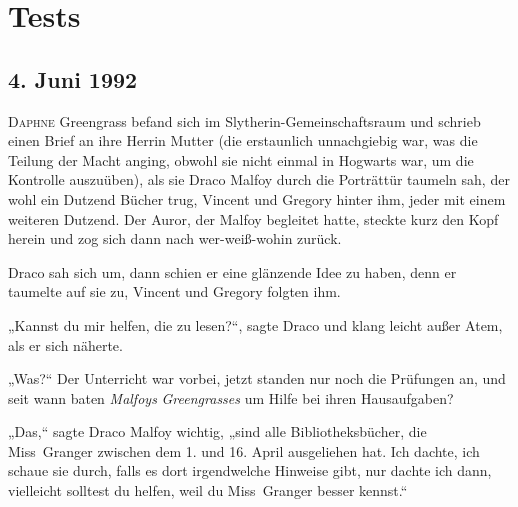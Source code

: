 \chapter{Tests}

\section{4. Juni 1992}

\lettrine{D}{aphne} Greengrass befand sich im Slytherin-Gemeinschaftsraum und schrieb einen Brief an ihre Herrin Mutter (die erstaunlich unnachgiebig war, was die Teilung der Macht anging, obwohl sie nicht einmal in Hogwarts war, um die Kontrolle auszuüben), als sie Draco Malfoy durch die Porträttür taumeln sah, der wohl ein Dutzend Bücher trug, Vincent und Gregory hinter ihm, jeder mit einem weiteren Dutzend. Der Auror, der Malfoy begleitet hatte, steckte kurz den Kopf herein und zog sich dann nach wer-weiß-wohin zurück.

Draco sah sich um, dann schien er eine glänzende Idee zu haben, denn er taumelte auf sie zu, Vincent und Gregory folgten ihm.

„Kannst du mir helfen, die zu lesen?“, sagte Draco und klang leicht außer Atem, als er sich näherte.

„Was?“ Der Unterricht war vorbei, jetzt standen nur noch die Prüfungen an, und seit wann baten \emph{Malfoys} \emph{Greengrasses} um Hilfe bei ihren Hausaufgaben?

„Das,“ sagte Draco Malfoy wichtig, „sind alle Bibliotheksbücher, die Miss~Granger zwischen dem 1. und 16. April ausgeliehen hat. Ich dachte, ich schaue sie durch, falls es dort irgendwelche Hinweise gibt, nur dachte ich dann, vielleicht solltest du helfen, weil du Miss~Granger besser kennst.“

